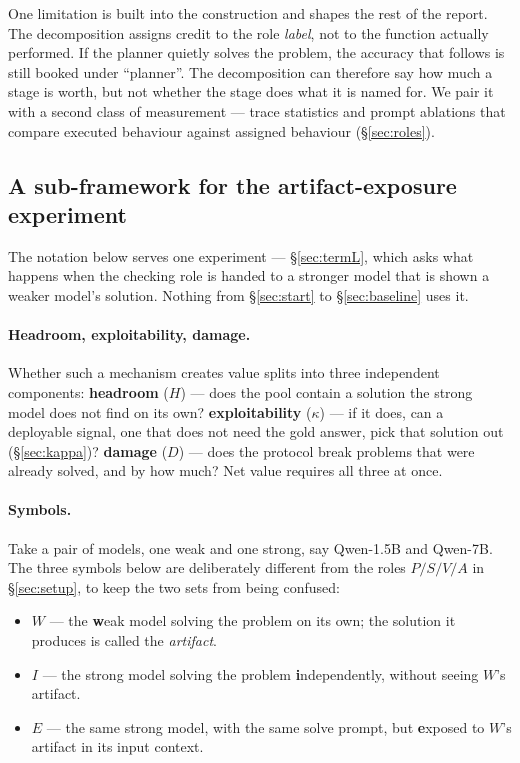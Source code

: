 \documentclass[11pt,a4paper]{article}
\begin{document}
One limitation is built into the construction and shapes the rest of the report. The decomposition
assigns credit to the role \emph{label}, not to the function actually performed. If the planner
quietly solves the problem, the accuracy that follows is still booked under ``planner''. The
decomposition can therefore say how much a stage is worth, but not whether the stage does what it
is named for. We pair it with a second class of measurement --- trace statistics and prompt
ablations that compare executed behaviour against assigned behaviour (\S\ref{sec:roles}).

\subsection{A sub-framework for the artifact-exposure experiment}\label{sec:identity}

The notation below serves one experiment --- \S\ref{sec:termL}, which asks what happens when the
checking role is handed to a stronger model that is shown a weaker model's solution. Nothing from
\S\ref{sec:start} to \S\ref{sec:baseline} uses it.

\paragraph{Headroom, exploitability, damage.}\label{sec:threeq} Whether such a mechanism creates
value splits into three independent components: \textbf{headroom} ($H$) --- does the pool contain a
solution the strong model does not find on its own? \textbf{exploitability} ($\kappa$) --- if it
does, can a deployable signal, one that does not need the gold answer, pick that solution out
(\S\ref{sec:kappa})? \textbf{damage} ($D$) --- does the protocol break problems that were already
solved, and by how much? Net value requires all three at once.

\paragraph{Symbols.} Take a pair of models, one weak and one strong, say Qwen-1.5B and Qwen-7B. The
three symbols below are deliberately different from the roles $P/S/V/A$ in \S\ref{sec:setup}, to
keep the two sets from being confused:

\begin{itemize}\itemsep1pt
\item $W$ --- the \textbf{w}eak model solving the problem on its own; the solution it produces is
      called the \emph{artifact}.
\item $I$ --- the strong model solving the problem \textbf{i}ndependently, without seeing $W$'s
      artifact.
\item $E$ --- the same strong model, with the same solve prompt, but \textbf{e}xposed to $W$'s
      artifact in its input context.
\end{itemize}
\end{document}
